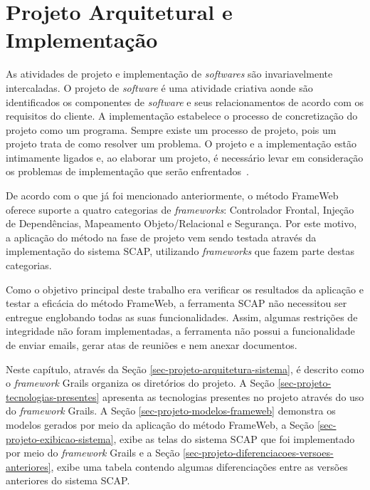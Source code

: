 \chapter{Projeto Arquitetural e Implementação}
\label{sec-projeto}

As atividades de projeto e implementação de \textit{softwares} são invariavelmente intercaladas. O projeto de \textit{software} é uma atividade criativa aonde são identificados os componentes de \textit{software} e seus relacionamentos de acordo com os requisitos do cliente. A implementação estabelece o processo de concretização do projeto como um programa. Sempre existe um processo de projeto, pois um projeto trata de como resolver um problema. O projeto e a implementação estão intimamente ligados e, ao elaborar um projeto, é necessário levar em consideração os problemas de implementação que serão enfrentados~\cite{sommerville:es11}.

De acordo com o que já foi mencionado anteriormente, o método FrameWeb oferece suporte a quatro categorias de \textit{frameworks}: Controlador Frontal, Injeção de Dependências, Mapeamento Objeto/Relacional e Segurança. Por este motivo, a aplicação do método na fase de projeto vem sendo testada através da implementação do sistema SCAP, utilizando \textit{frameworks} que fazem parte destas categorias.

Como o objetivo principal deste trabalho era verificar os resultados da aplicação e testar a eficácia do método FrameWeb, a ferramenta SCAP não necessitou ser entregue englobando todas as suas funcionalidades. Assim, algumas restrições de integridade não foram implementadas, a ferramenta não possui a funcionalidade de enviar emails, gerar atas de reuniões e nem anexar documentos.

Neste capítulo, através da Seção \ref{sec-projeto-arquitetura-sistema}, é descrito como o \textit{framework} Grails organiza os diretórios do projeto. A Seção \ref{sec-projeto-tecnologias-presentes} apresenta as tecnologias presentes no projeto através do uso do \textit{framework} Grails. A Seção \ref{sec-projeto-modelos-frameweb} demonstra os modelos gerados por meio da aplicação do método FrameWeb, a Seção \ref{sec-projeto-exibicao-sistema}, exibe as telas do sistema SCAP que foi implementado por meio do \textit{framework} Grails e a Seção \ref{sec-projeto-diferenciacoes-versoes-anteriores}, exibe uma tabela contendo algumas diferenciações entre as versões anteriores do sistema SCAP.           


